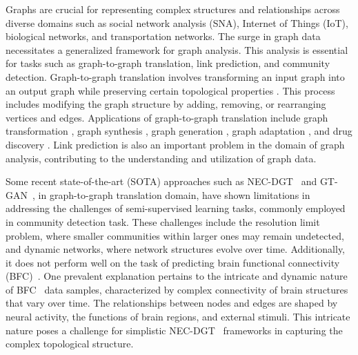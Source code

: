 Graphs are crucial for representing complex structures and relationships across diverse domains such as social network analysis (SNA), Internet of Things (IoT), biological networks, and transportation networks. The surge in graph data necessitates a generalized framework for graph analysis. This analysis is essential for tasks such as graph-to-graph translation, link prediction, and community detection. Graph-to-graph translation involves transforming an input graph into an output graph while preserving certain topological properties \cite{guo2019deep, lowe2014patent, van2013wu}. This process includes modifying the graph structure by adding, removing, or rearranging vertices and edges. Applications of graph-to-graph translation include graph transformation \cite{rong2020self}, graph synthesis \cite{nebli2020deep}, graph generation \cite{tang2020unbiased}, graph adaptation \cite{bai2020adaptive}, and drug discovery \cite{wu2022spatial}. Link prediction \cite{wang2020edge2vec, zitnikbiosnap} is also an important problem in the domain of graph analysis,  contributing to the understanding and utilization of graph data.

Some recent state-of-the-art (SOTA) approaches such as NEC-DGT~\cite{guo2019deep} and GT-GAN~\cite{9737289}, in graph-to-graph translation domain, have shown limitations in addressing the challenges of semi-supervised learning tasks, commonly employed in community detection task. These challenges include the resolution limit problem, where smaller communities within larger ones may remain undetected, and dynamic networks, where network structures evolve over time. 
Additionally, it does not perform well on the task of predicting brain functional connectivity (BFC)~\cite{van2013wu}. One prevalent explanation pertains to the intricate and dynamic nature of BFC~\cite{van2013wu} data samples, characterized by complex connectivity of brain structures that vary over time. The relationships between nodes and edges are shaped by neural activity, the functions of brain regions, and external stimuli. This intricate nature poses a challenge for simplistic NEC-DGT~\cite{guo2019deep} frameworks in capturing the complex topological structure.

